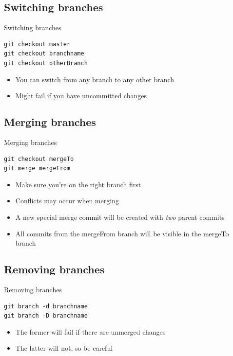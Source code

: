 \documentclass[10pt,a4paper]{beamer}
\begin{document}
\subsection{Switching branches}
\begin{frame}[fragile]{Switching branches}
\begin{verbatim}
git checkout master
git checkout branchname
git checkout otherBranch
\end{verbatim}
\begin{itemize}
\item You can switch from any branch to any other branch
\item Might fail if you have uncommitted changes
\end{itemize}
\end{frame}

\subsection{Merging branches}
\begin{frame}[fragile]{Merging branches}
\begin{verbatim}
git checkout mergeTo
git merge mergeFrom
\end{verbatim}
\begin{itemize}
\item Make sure you're on the right branch first
\item Conflicts may occur when merging
\item A new special merge commit will be created with \textit{two} parent commits
\item All commits from the mergeFrom branch will be visible in the mergeTo branch
\end{itemize}
\end{frame}

\subsection{Removing branches}
\begin{frame}[fragile]{Removing branches}
\begin{verbatim}
git branch -d branchname
git branch -D branchname
\end{verbatim}
\begin{itemize}
\item The former will fail if there are unmerged changes
\item The latter will not, so be careful
\end{itemize}
\end{frame}
\end{document}
